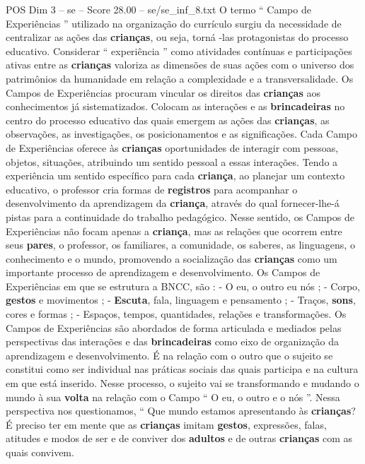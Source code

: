 \begin{textsample}{POS Dim 3 – se – Score 28.00 – se/se\_inf\_8.txt}
O termo “ Campo de Experiências ” utilizado na organização do currículo surgiu da necessidade de centralizar as ações das \textbf{crianças}, ou seja, torná -las protagonistas do processo educativo.
Considerar “ experiência ” como atividades contínuas e participações ativas entre as \textbf{crianças} valoriza as dimensões de suas ações com o universo dos patrimônios da humanidade em relação a complexidade e a transversalidade.
Os Campos de Experiências procuram vincular os direitos das \textbf{crianças} aos conhecimentos já sistematizados.
Colocam as interações e as \textbf{brincadeiras} no centro do processo educativo das quais emergem as ações das \textbf{crianças}, as observações, as investigações, os posicionamentos e as significações.
Cada Campo de Experiências oferece às \textbf{crianças} oportunidades de interagir com pessoas, objetos, situações, atribuindo um sentido pessoal a essas interações.
Tendo a experiência um sentido específico para cada \textbf{criança}, ao planejar um contexto educativo, o professor cria formas de \textbf{registros} para acompanhar o desenvolvimento da aprendizagem da \textbf{criança}, através do qual fornecer-lhe-á pistas para a continuidade do trabalho pedagógico.
Nesse sentido, os Campos de Experiências não focam apenas a \textbf{criança}, mas as relações que ocorrem entre seus \textbf{pares}, o professor, os familiares, a comunidade, os saberes, as linguagens, o conhecimento e o mundo, promovendo a socialização das \textbf{crianças} como um importante processo de aprendizagem e desenvolvimento.
Os Campos de Experiências em que se estrutura a BNCC, são : - O eu, o outro eu nós ; - Corpo, \textbf{gestos} e movimentos ; - \textbf{Escuta}, fala, linguagem e pensamento ; - Traços, \textbf{sons}, cores e formas ; - Espaços, tempos, quantidades, relações e transformações.
Os Campos de Experiências são abordados de forma articulada e mediados pelas perspectivas das interações e das \textbf{brincadeiras} como eixo de organização da aprendizagem e desenvolvimento.
É na relação com o outro que o sujeito se constitui como ser individual nas práticas sociais das quais participa e na cultura em que está inserido.
Nesse processo, o sujeito vai se transformando e mudando o mundo à sua \textbf{volta} na relação com o Campo “ O eu, o outro e o nós ”.
Nessa perspectiva nos questionamos, “ Que mundo estamos apresentando às \textbf{crianças}?
É preciso ter em mente que as \textbf{crianças} imitam \textbf{gestos}, expressões, falas, atitudes e modos de ser e de conviver dos \textbf{adultos} e de outras \textbf{crianças} com as quais convivem.

\end{textsample}

